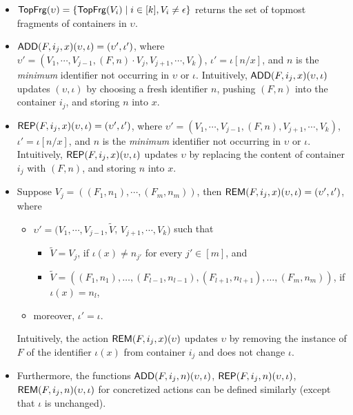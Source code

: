\begin{itemize}
\item %
${\sf TopFrg}(\upsilon) = \{{\sf TopFrg}(V_i) \mid i \in [k], V_i \neq \epsilon\}$ returns the set of topmost fragments of containers in $\upsilon$.
%
%
\item  $\mathsf{ADD}(F, i_j, x)(\upsilon, \iota) = (\upsilon', \iota')$, where $\upsilon' = (V_1, \cdots, V_{j-1}, (F, n) \cdot V_j, V_{j+1}, \cdots, V_k)$, $\iota' =\iota[n/x]$,  and $n$ is the \emph{minimum} identifier not occurring in $\upsilon$ or $\iota$. Intuitively, $\mathsf{ADD}(F, i_j, x)(\upsilon, \iota)$ updates $(\upsilon, \iota)$ by choosing a fresh identifier $n$, pushing $(F, n)$ into the container $i_j$, and storing $n$ into $x$. 
%
 \item $\mathsf{REP}(F, i_j, x)(\upsilon, \iota) =  (\upsilon', \iota')$, where $\upsilon' = (V_1, \cdots, V_{j-1}, (F, n), V_{j+1}, \cdots, V_k)$, $\iota' = \iota[n/x]$, and $n$ is the \emph{minimum} identifier not occurring in  $\upsilon$ or $\iota$. Intuitively, $\mathsf{REP}(F, i_j, x)(\upsilon, \iota)$ updates $\upsilon$ by replacing the content of container $i_j$ with $(F, n)$, and storing $n$ into $x$.
%
\item Suppose $V_j = ((F_1, n_1), \cdots, (F_{m}, n_m))$, then
%
$\mathsf{REM}(F, i_j, x)(\upsilon, \iota) = (\upsilon', \iota')$, 
%
where 
\begin{itemize}
\item $\upsilon' = (V_1, \cdots, V_{j-1}, \tilde{V}$, $V_{j+1}, \cdots, V_k)$ such that
\begin{itemize}
\item $\tilde{V} = V_j$,  if $\iota(x) \neq n_{j'}$ for every $j' \in [m]$, and 
\item $\tilde{V} = ((F_1,n_1), \dots, (F_{l-1}, n_{l-1}), (F_{l+1}, n_{l+1}), \dots, (F_{m}, n_m))$, if $\iota(x) = n_l$, 
\end{itemize}
\item moreover, $\iota' = \iota$.
\end{itemize}

Intuitively, the action $\mathsf{REM}(F, i_j, x)(\upsilon)$ updates $\upsilon$ by removing the instance of $F$ of the identifier $\iota(x)$ from container $i_j$ and does not change $\iota$.
%
\item Furthermore, the functions $\mathsf{ADD}(F, i_j, n)(\upsilon, \iota)$, $\mathsf{REP}(F, i_j, n)(\upsilon, \iota)$, $\mathsf{REM}(F, i_j, n)(\upsilon, \iota)$ for concretized actions can be defined similarly (except that $\iota$ is unchanged).
\end{itemize}

